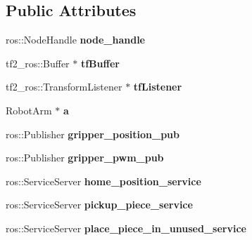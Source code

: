 \subsection*{Public Attributes}
\begin{DoxyCompactItemize}
\item 
\mbox{\label{classgo__motion__planner_a137b63ec71d998759681bd36ce77355a}} 
ros\+::\+Node\+Handle {\bfseries node\+\_\+handle}
\item 
\mbox{\label{classgo__motion__planner_a7c1cd68df2477d7a9944e3f935811466}} 
tf2\+\_\+ros\+::\+Buffer $\ast$ {\bfseries tf\+Buffer}
\item 
\mbox{\label{classgo__motion__planner_a110a6be424abaacc5d9b9a2639cd96ef}} 
tf2\+\_\+ros\+::\+Transform\+Listener $\ast$ {\bfseries tf\+Listener}
\item 
\mbox{\label{classgo__motion__planner_a6662efdfcafc6666a9bb55e510bdbc0d}} 
Robot\+Arm $\ast$ {\bfseries a}
\item 
\mbox{\label{classgo__motion__planner_a20901c51849ef539e07dac1a5348e32b}} 
ros\+::\+Publisher {\bfseries gripper\+\_\+position\+\_\+pub}
\item 
\mbox{\label{classgo__motion__planner_a9e6b2947da5aeb1e59d7370b88c811b2}} 
ros\+::\+Publisher {\bfseries gripper\+\_\+pwm\+\_\+pub}
\item 
\mbox{\label{classgo__motion__planner_a33ec45d00ae237e7e117a1c1587be075}} 
ros\+::\+Service\+Server {\bfseries home\+\_\+position\+\_\+service}
\item 
\mbox{\label{classgo__motion__planner_a3d3fe68d135a64e31b1f6d6431a720bf}} 
ros\+::\+Service\+Server {\bfseries pickup\+\_\+piece\+\_\+service}
\item 
\mbox{\label{classgo__motion__planner_a718ae47b74a57268d84a4abdafa4b4ae}} 
ros\+::\+Service\+Server {\bfseries place\+\_\+piece\+\_\+in\+\_\+unused\+\_\+service}
\item 

\end{DoxyCompactItemize}
